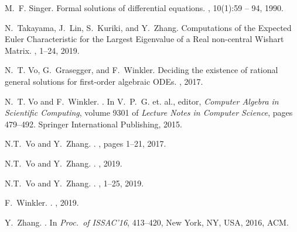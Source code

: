 \documentclass[10pt,a4paper]{article}
\begin{document}
\begin{thebibliography}{10}
M.~F. Singer.
\newblock Formal solutions of differential equations.
, 10(1):59 -- 94, 1990.

N.~Takayama, J.~Lin, S.~Kuriki, and Y.~Zhang.
\newblock Computations of the Expected Euler Characteristic for the Largest Eigenvalue of a Real non-central Wishart Matrix. 
, 1--24, 2019. 

N.~T. Vo, G.~Grasegger, and F.~Winkler.
\newblock Deciding the existence of rational general solutions for first-order
  algebraic {ODEs}.
, 2017.

N.~T. Vo and F.~Winkler.
.
\newblock In V.~P.~G. et. al., editor, {\em {Computer Algebra in Scientific
  Computing}}, volume 9301 of {\em Lecture Notes in Computer Science}, pages
  479--492. Springer International Publishing, 2015.
  
N.T.~Vo and Y.~Zhang.
.
, pages 1--21,  2017.

N.T.~Vo and Y.~Zhang.
.
, 2019.

N.T.~Vo and Y.~Zhang.
.
, 1--25, 2019.

F.~Winkler.
.
, 2019. 

Y.~Zhang.
.
\newblock In {\em Proc.\ of ISSAC'16},  413--420, New York, NY, USA, 2016, ACM.

\end{thebibliography}
\end{document}
